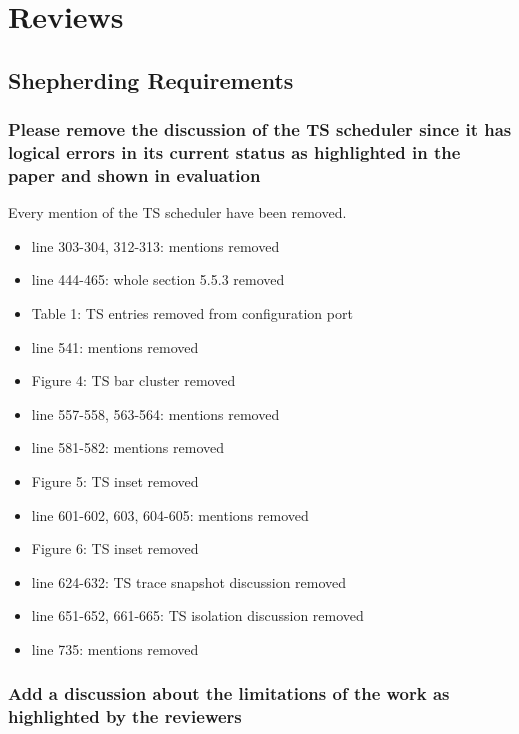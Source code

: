 \newpage
\section{Reviews}

    \subsection{Shepherding Requirements}

        \subsubsection{Please remove the discussion of the TS
        scheduler since it has logical errors in its current status as
        highlighted in the paper and shown in evaluation}

         \label{subsubsec:ts_removal}
            Every mention of the TS scheduler have been removed.
            \begin{itemize}
                \item line 303-304, 312-313: mentions removed
                \item line 444-465: whole section 5.5.3 removed
                \item Table 1: TS entries removed from configuration port
                \item line 541: mentions removed
                \item Figure 4: TS bar cluster removed
                \item line 557-558, 563-564: mentions removed
                \item line 581-582: mentions removed
                \item Figure 5: TS inset removed
                \item line 601-602, 603, 604-605: mentions removed
                \item Figure 6: TS inset removed
                \item line 624-632: TS trace snapshot discussion removed
                \item line 651-652, 661-665: TS isolation discussion removed
                \item line 735: mentions removed
            \end{itemize}

        \subsubsection{Add a discussion about the limitations of the
        work as highlighted by the reviewers}

